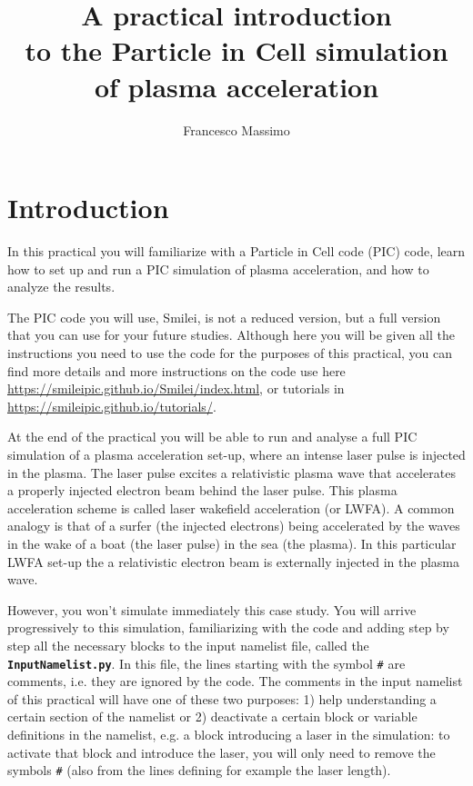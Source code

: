 \documentclass[a4paper,12pt]{extarticle}
\title{\vspace{-2.cm}A practical introduction \\to the Particle in Cell simulation \\of plasma acceleration}
\author{Francesco Massimo}
\newcommand{\smilei}{{\sc Smilei}\xspace}
\newcommand{\commandline}[1]{\texttt{\textbf{#1}}}
\begin{document}
\maketitle

\tableofcontents

\section{Introduction} %
In this practical you will familiarize with a Particle in Cell code (PIC) code, learn how to set up and run a PIC simulation of plasma acceleration, and how to analyze the results.

The PIC code you will use, \smilei, is not a reduced version, but a full version that you can use for your future studies. Although here you will be given all the instructions you need to use the code for the purposes of this practical, you can find more details and more instructions on the code use here \url{https://smileipic.github.io/Smilei/index.html}, or tutorials in \url{https://smileipic.github.io/tutorials/}.

At the end of the practical you will be able to run and analyse a full PIC simulation of a plasma acceleration set-up, where an intense laser pulse is injected in the plasma. The laser pulse excites a relativistic plasma wave that accelerates a properly injected electron beam behind the laser pulse.  This plasma acceleration scheme is called laser wakefield acceleration (or LWFA).  A common analogy is that of a surfer (the injected electrons) being accelerated by the waves in the wake of a boat (the laser pulse) in the sea (the plasma).  In this particular LWFA set-up the a relativistic electron beam is externally injected in the plasma wave.

However, you won't simulate immediately this case study.  You will arrive progressively to this simulation, familiarizing with the code and adding step by step all the necessary blocks to the input namelist file, called the \commandline{InputNamelist.py}. In this file, the lines starting with the symbol \texttt{\#} are comments, i.e. they are ignored by the code. The comments in the input namelist of this practical will have one of these two purposes: 1) help understanding a certain section of the namelist or 2) deactivate a certain block or variable definitions in the namelist, e.g. a block introducing a laser in the simulation: to activate that block and introduce the laser, you will only need to remove the symbols \texttt{\#} (also from the lines defining for example the laser length).
\end{document}
